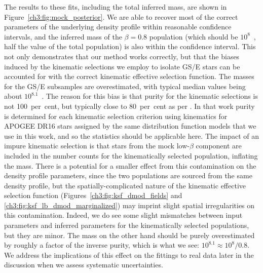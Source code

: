 The results to these fits, including the total inferred mass, are shown in Figure~\ref{ch3:fig:mock_posterior}. We are able to recover most of the correct parameters of the underlying density profile within reasonable confidence intervals, and the inferred mass of the $\beta=0.8$ population (which should be $10^{8}$~\Msun, half the value of the total population) is also within the confidence interval. This not only demonstrates that our method works correctly, but that the biases induced by the kinematic selections we employ to isolate GS/E stars can be accounted for with the correct kinematic effective selection function. The masses for the GS/E subsamples are overestimated, with typical median values being about $10^{8.1}$~\Msun. The reason for this bias is that purity for the kinematic selections is not 100~per~cent, but typically close to 80~per~cent as per \cite{lane22} \parencite[also see e.g.][]{limberg22}. In that work purity is determined for each kinematic selection criterion using kinematics for APOGEE DR16 stars assigned by the same distribution function models that we use in this work, and so the statistics should be applicable here. The impact of an impure kinematic selection is that stars from the mock low-$\beta$ component are included in the number counts for the kinematically selected population, inflating the mass. There is a potential for a smaller effect from this contamination on the density profile parameters, since the two populations are sourced from the same density profile, but the spatially-complicated nature of the kinematic effective selection function (Figures~\ref{ch3:fig:ksf_dmod_fields} and \ref{ch3:fig:ksf_lb_dmod_marginalized}) may imprint slight spatial irregularities on this contamination. Indeed, we do see some slight mismatches between input parameters and inferred parameters for the kinematically selected populations, but they are minor. The mass on the other hand should be purely overestimated by roughly a factor of the inverse purity, which is what we see: $10^{8.1} \approx 10^{8}/0.8$. We address the implications of this effect on the fittings to real data later in the discussion when we assess systematic uncertainties.

